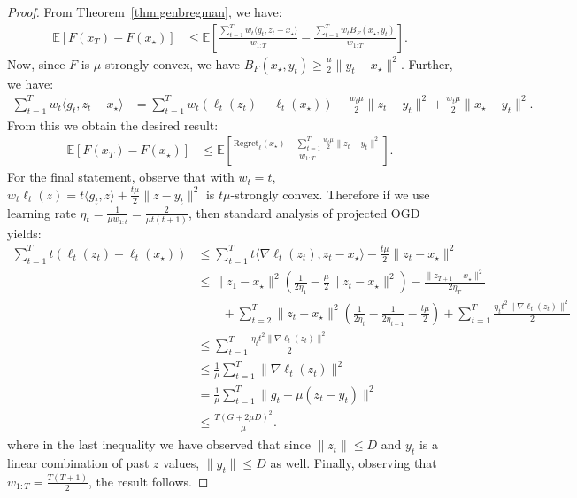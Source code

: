 \documentclass{article}
\newcommand{\E}{\mathbb{E}}
\begin{document}
\begin{proof}
From Theorem~\ref{thm:genbregman}, we have:
\begin{align*}
    \E[F(x_T) - F(x_\star)]&\le \E\left[\frac{\sum_{t=1}^T w_t\langle g_t, z_t - x_\star\rangle}{w_{1:T}} - \frac{\sum_{t=1}^T w_t B_F(x_\star, y_t)}{w_{1:T}}\right].
\end{align*}
Now, since $F$ is $\mu$-strongly convex, we have $B_F(x_\star,  y_t)\ge \frac{\mu}{2}\|y_t-x_\star\|^2$. Further,  we have:
\begin{align*}
    \sum_{t=1}^T w_t\langle g_t, z_t - x_\star\rangle&=\sum_{t=1}^T w_t (\ell_t(z_t) - \ell_t(x_\star)) - \frac{w_t\mu}{2}\|z_t - y_t\|^2 + \frac{w_t\mu}{2}\|x_\star - y_t\|^2.
\end{align*}
From this we obtain the desired  result:
\begin{align*}
    \E[F(x_T) - F(x_\star)]&\le \E\left[\frac{\text{Regret}_{\ell}(x_\star) -\sum_{t=1}^T \frac{w_t \mu}{2}\|z_t -y_t\|^2}{w_{1:T}}\right].
\end{align*}
For the final statement, observe that with  $w_t=t$, $w_t \ell_t(z)=t\langle g_t, z\rangle + \frac{t \mu}{2}\|z-y_t\|^2$ is $t\mu$-strongly convex. Therefore if we use learning rate $\eta_t = \frac{1}{\mu w_{1:t}} = \frac{2}{\mu t(t+1)}$, then standard analysis of projected OGD yields:
\begin{align*}
    \sum_{t=1}^T t(\ell_t(z_t) - \ell_t(x_\star))&\le \sum_{t=1}^T t \langle \nabla \ell_t(z_t), z_t - x_\star\rangle - \frac{t\mu}{2}\|z_t  - x_\star\|^2\\
    &\le \|z_1-x_\star\|^2\left(\frac{1}{2\eta_1} - \frac{\mu}{2}\|z_t  -x_\star\|^2\right) -\frac{\|z_{T+1}-x_\star\|^2}{2\eta_T}\\
    &\qquad+ \sum_{t=2}^T \|z_t - x_\star\|^2\left(\frac{1}{2\eta_t} - \frac{1}{2\eta_{t-1}} - \frac{t\mu}{2}\right) + \sum_{t=1}^T \frac{\eta_tt^2\|\nabla \ell_t(z_t)\|^2}{2}\\
    &\le  \sum_{t=1}^T \frac{\eta_t t^2\|\nabla \ell_t(z_t)\|^2}{2}\\
    &\le \frac{1}{\mu}\sum_{t=1}^T \|\nabla \ell_t(z_t)\|^2\\
    &= \frac{1}{\mu}\sum_{t=1}^T \|g_t + \mu(z_t - y_t)\|^2\\
    &\le  \frac{T(G+ 2\mu D)^2}{\mu}.
\end{align*}
where in the last inequality we have observed that since $\|z_t\|\le D$ and $y_t$ is a linear combination of past $z$ values, $\|y_t\|\le D$ as well.
Finally, observing that $w_{1:T} = \frac{T(T+1)}{2}$, the result follows.
\end{proof} 
\end{document}

